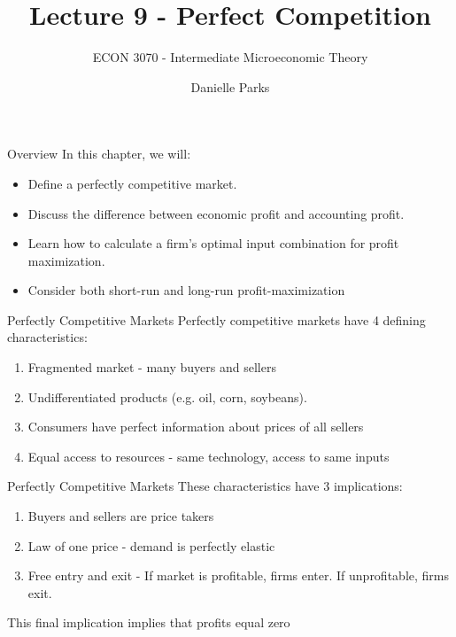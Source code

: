 \documentclass{beamer}
\author{Danielle Parks}
\title{Lecture 9 - Perfect Competition}
\subtitle{ECON 3070 - Intermediate Microeconomic Theory}
\begin{document}
\begin{frame}
  \titlepage
\end{frame}

\begin{frame}{Overview}
  In this chapter, we will:

  \begin{itemize}
    \item Define a perfectly competitive market.
    
    \item Discuss the difference between economic profit and accounting profit.
    
    \item Learn how to calculate a firm's optimal input combination for profit maximization.
    
    \item Consider both short-run and long-run profit-maximization
  \end{itemize}
\end{frame}

\begin{frame}{Perfectly Competitive Markets}
  Perfectly competitive markets have 4 defining characteristics:

  \begin{enumerate}
    \item Fragmented market - many buyers and sellers
    
    \item Undifferentiated products (e.g. oil, corn, soybeans).
    
    \item Consumers have perfect information about prices of all sellers
    
    \item Equal access to resources - same technology, access to same inputs
  \end{enumerate}
\end{frame}

\begin{frame}{Perfectly Competitive Markets}
  These characteristics have 3 implications:
  \bigskip

  \begin{enumerate}
    \item Buyers and sellers are price takers
    
    \item Law of one price - demand is perfectly elastic
    
    \item Free entry and exit - If market is profitable, firms enter. If unprofitable, firms exit.
  \end{enumerate}

  \bigskip
  This final implication implies that profits equal zero
\end{frame}
\end{document}
